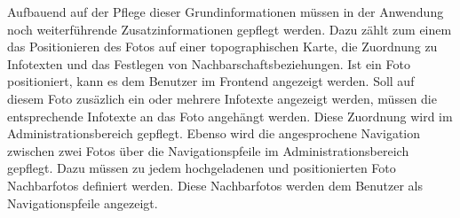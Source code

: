 Aufbauend auf der Pflege dieser Grundinformationen müssen in der Anwendung noch weiterführende Zusatzinformationen gepflegt
werden. Dazu zählt zum einem das Positionieren des Fotos auf einer topographischen Karte, die Zuordnung zu Infotexten und
das Festlegen von Nachbarschaftsbeziehungen. Ist ein Foto positioniert, kann es dem Benutzer im Frontend angezeigt werden.
Soll auf diesem Foto zusäzlich ein oder mehrere Infotexte angezeigt werden, müssen die entsprechende Infotexte an das Foto
angehängt werden. Diese Zuordnung wird im Administrationsbereich gepflegt. Ebenso wird die angesprochene Navigation
zwischen zwei Fotos über die Navigationspfeile im Administrationsbereich gepflegt. Dazu müssen zu jedem hochgeladenen und
positionierten Foto Nachbarfotos definiert werden. Diese Nachbarfotos werden dem Benutzer als Navigationspfeile angezeigt.